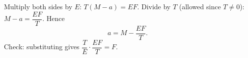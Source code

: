 Multiply both sides by $E$: $T(M-a)=EF$. Divide by $T$ (allowed since $T\ne0$): $M-a=\dfrac{EF}{T}$. Hence
\[
\boxed{a=M-\dfrac{EF}{T}}.
\]
Check: substituting gives $\dfrac{T}{E}\cdot\dfrac{EF}{T}=F$.
